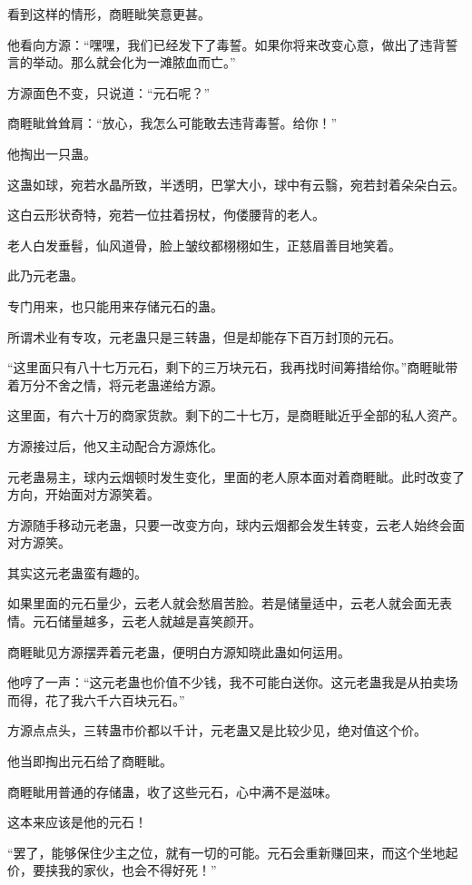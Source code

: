 \begin{this_body}
看到这样的情形，商睚眦笑意更甚。

他看向方源：“嘿嘿，我们已经发下了毒誓。如果你将来改变心意，做出了违背誓言的举动。那么就会化为一滩脓血而亡。”

方源面色不变，只说道：“元石呢？”

商睚眦耸耸肩：“放心，我怎么可能敢去违背毒誓。给你！”

他掏出一只蛊。

这蛊如球，宛若水晶所致，半透明，巴掌大小，球中有云翳，宛若封着朵朵白云。

这白云形状奇特，宛若一位拄着拐杖，佝偻腰背的老人。

老人白发垂髫，仙风道骨，脸上皱纹都栩栩如生，正慈眉善目地笑着。

此乃元老蛊。

专门用来，也只能用来存储元石的蛊。

所谓术业有专攻，元老蛊只是三转蛊，但是却能存下百万封顶的元石。

“这里面只有八十七万元石，剩下的三万块元石，我再找时间筹措给你。”商睚眦带着万分不舍之情，将元老蛊递给方源。

这里面，有六十万的商家货款。剩下的二十七万，是商睚眦近乎全部的私人资产。

方源接过后，他又主动配合方源炼化。

元老蛊易主，球内云烟顿时发生变化，里面的老人原本面对着商睚眦。此时改变了方向，开始面对方源笑着。

方源随手移动元老蛊，只要一改变方向，球内云烟都会发生转变，云老人始终会面对方源笑。

其实这元老蛊蛮有趣的。

如果里面的元石量少，云老人就会愁眉苦脸。若是储量适中，云老人就会面无表情。元石储量越多，云老人就越是喜笑颜开。

商睚眦见方源摆弄着元老蛊，便明白方源知晓此蛊如何运用。

他哼了一声：“这元老蛊也价值不少钱，我不可能白送你。这元老蛊我是从拍卖场而得，花了我六千六百块元石。”

方源点点头，三转蛊市价都以千计，元老蛊又是比较少见，绝对值这个价。

他当即掏出元石给了商睚眦。

商睚眦用普通的存储蛊，收了这些元石，心中满不是滋味。

这本来应该是他的元石！

“罢了，能够保住少主之位，就有一切的可能。元石会重新赚回来，而这个坐地起价，要挟我的家伙，也会不得好死！”


\end{this_body}
